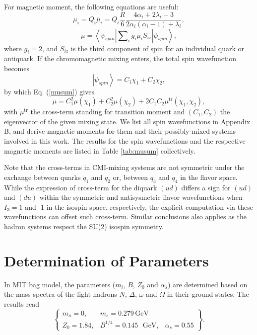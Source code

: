 \documentclass[12pt,onecolumn,floatfix,nofootinbib]{revtex4}
\begin{document}
For magnetic moment, the following equations \cite%
{DeGrand:1975cf,Wang:2016dzu} are useful:
\begin{equation}
\mu _{i}=Q_{i}\bar{\mu}_{i}=Q_{i}\frac{R}{6}\frac{4\alpha _{i}+2\lambda
_{i}-3}{2\alpha _{i}\left( \alpha _{i}-1\right) +\lambda _{i}},  \label{mui}
\end{equation}%
\begin{equation}
\mu =\left\langle \psi _{spin}\left\vert \sum\nolimits_{i}g_{i}\mu
_{i}S_{iz}\right\vert \psi _{spin}\right\rangle ,  \label{musum}
\end{equation}%
where $g_{i}=2$, and $S_{iz}$ is the third component of spin for an
individual quark or antiquark. If the chromomagnetic mixing enters, the
total spin wavefunction becomes
\begin{equation}
\left\vert \psi _{spin}\right\rangle =C_{1}\chi _{1}+C_{2}\chi _{2},
\end{equation}%
by which Eq. (\ref{musum}) gives
\begin{equation}
\mu =C_{1}^{2}\mu \left( \chi _{1}\right) +C_{2}^{2}\mu \left( \chi
_{2}\right) +2C_{1}C_{2}\mu ^{\mathrm{tr}}\left( \chi _{1},\chi _{2}\right) ,
\end{equation}%
with $\mu ^{\mathrm{tr}}$ the cross-term standing for transition moment 
\cite{Bernotas:2012nz} and $(C_{1},C_{2})$ the eigenvector of the given 
mixing state. We list all spin wavefunctions in Appendix B, and derive 
magnetic moments for them and their possibly-mixed systems involved in 
this work. The results for the spin wavefunctions and the respective 
magnetic moments are listed in Table \ref{tab:musum} collectively.

Note that the cross-terms in CMI-mixing systems are not symmetric
under the exchange between quarks $q_{1}$ and $q_{2}$ or, between $q_{3}$
and $q_{4}$ in the flavor space. While the expression of cross-term for the 
diquark $(ud)$ differs a sign for $(ud)$ and $(du)$ within the symmetric and 
antisysmetric flavor wavefunctions when $I_{3}=1$ and -1 in the isospin space, 
respectively, the explicit computation via these wavefunctions can offset such 
cross-term. Similar conclusions also applies as the hadron systems respect 
the SU(2) isospin symmetry.

\section{Determination of Parameters}

\label{Parameters} In MIT bag model, the parameters ($m_{i}$, $B$, $Z_{0}$
and $\alpha _{s}$) are determined based on the mass spectra of the light
hadrons $N$, $\Delta $, $\omega $ and $\Omega $ in their ground states. The
results read \cite{DeGrand:1975cf}
\begin{equation}
\begin{Bmatrix}
m_{n}=0, & m_{s}=0.279\,\mathrm{GeV} &  \\
Z_{0}=1.84, & B^{1/4}=0.145\text{ }\mathrm{GeV,} & \alpha _{s}=0.55%
\end{Bmatrix}.
\label{oripar}
\end{equation}
\end{document}
